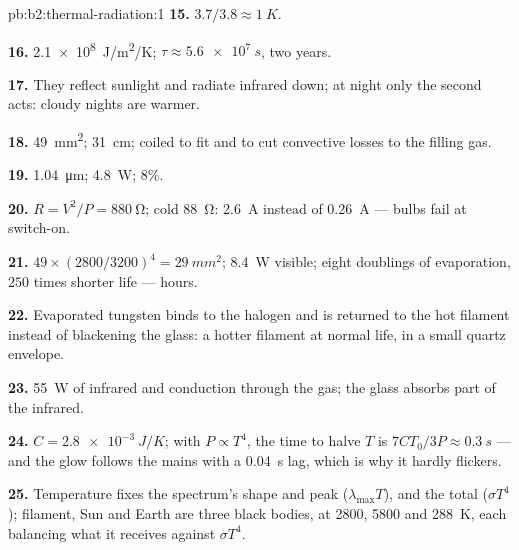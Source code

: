 \begin{solution}{pb:b2:thermal-radiation:1}
\textbf{15.} $3.7/3.8 \approx \qty{1}{K}$.

\textbf{16.} \qty{2.1e8}{J/m^2/K}; $\tau \approx \qty{5.6e7}{s}$, two years.

\textbf{17.} They reflect sunlight and radiate infrared down; at night
only the second acts: cloudy nights are warmer.

\textbf{18.} \qty{49}{mm^2}; \qty{31}{cm}; coiled to fit and to cut
convective losses to the filling gas.

\textbf{19.} \qty{1.04}{\micro m}; \qty{4.8}{W}; $8\%$.

\textbf{20.} $R = V^2/P = \qty{880}{\ohm}$; cold \qty{88}{\ohm}: \qty{2.6}{A}
instead of \qty{0.26}{A} --- bulbs fail at switch-on.

\textbf{21.} $49 \times (2800/3200)^4 = \qty{29}{mm^2}$; \qty{8.4}{W} visible; eight
doublings of evaporation, $250$ times shorter life --- hours.

\textbf{22.} Evaporated tungsten binds to the halogen and is returned
to the hot filament instead of blackening the glass: a hotter filament
at normal life, in a small quartz envelope.

\textbf{23.} \qty{55}{W} of infrared and conduction through the gas; the
glass absorbs part of the infrared.

\textbf{24.} $C = \qty{2.8e-3}{J/K}$; with $P \propto T^4$, the time to halve $T$
is $7CT_0/3P \approx \qty{0.3}{s}$ --- and the glow follows the mains
with a \qty{0.04}{s} lag, which is why it hardly flickers.

\textbf{25.} Temperature fixes the spectrum's shape and peak
($\lambda_{\max}T$), and the total ($\sigma T^4$); filament, Sun and Earth
are three black bodies, at \qty{2800}{}, \qty{5800}{} and \qty{288}{K}, each
balancing what it receives against $\sigma T^4$.
\end{solution}
